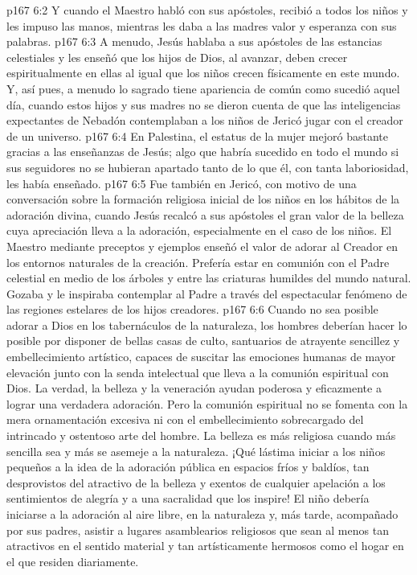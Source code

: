 \vs p167 6:2 Y cuando el Maestro habló con sus apóstoles, recibió a todos los niños y les impuso las manos, mientras les daba a las madres valor y esperanza con sus palabras.
\vs p167 6:3 \pc A menudo, Jesús hablaba a sus apóstoles de las estancias celestiales y les enseñó que los hijos de Dios, al avanzar, deben crecer espiritualmente en ellas al igual que los niños crecen físicamente en este mundo. Y, así pues, a menudo lo sagrado tiene apariencia de común como sucedió aquel día, cuando estos hijos y sus madres no se dieron cuenta de que las inteligencias expectantes de Nebadón contemplaban a los niños de Jericó jugar con el creador de un universo.
\vs p167 6:4 \pc En Palestina, el estatus de la mujer mejoró bastante gracias a las enseñanzas de Jesús; algo que habría sucedido en todo el mundo si sus seguidores no se hubieran apartado tanto de lo que él, con tanta laboriosidad, les había enseñado.
\vs p167 6:5 \pc Fue también en Jericó, con motivo de una conversación sobre la formación religiosa inicial de los niños en los hábitos de la adoración divina, cuando Jesús recalcó a sus apóstoles el gran valor de la belleza cuya apreciación lleva a la adoración, especialmente en el caso de los niños. El Maestro mediante preceptos y ejemplos enseñó el valor de adorar al Creador en los entornos naturales de la creación. Prefería estar en comunión con el Padre celestial en medio de los árboles y entre las criaturas humildes del mundo natural. Gozaba y le inspiraba contemplar al Padre a través del espectacular fenómeno de las regiones estelares de los hijos creadores.
\vs p167 6:6 Cuando no sea posible adorar a Dios en los tabernáculos de la naturaleza, los hombres deberían hacer lo posible por disponer de bellas casas de culto, santuarios de atrayente sencillez y embellecimiento artístico, capaces de suscitar las emociones humanas de mayor elevación junto con la senda intelectual que lleva a la comunión espiritual con Dios. La verdad, la belleza y la veneración ayudan poderosa y eficazmente a lograr una verdadera adoración. Pero la comunión espiritual no se fomenta con la mera ornamentación excesiva ni con el embellecimiento sobrecargado del intrincado y ostentoso arte del hombre. La belleza es más religiosa cuando más sencilla sea y más se asemeje a la naturaleza. ¡Qué lástima iniciar a los niños pequeños a la idea de la adoración pública en espacios fríos y baldíos, tan desprovistos del atractivo de la belleza y exentos de cualquier apelación a los sentimientos de alegría y a una sacralidad que los inspire! El niño debería iniciarse a la adoración al aire libre, en la naturaleza y, más tarde, acompañado por sus padres, asistir a lugares asamblearios religiosos que sean al menos tan atractivos en el sentido material y tan artísticamente hermosos como el hogar en el que residen diariamente.
